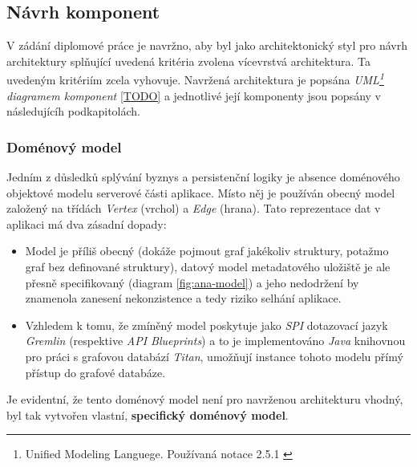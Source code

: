 \subsection{Návrh komponent}
\label{sec:des_components}
V zádání diplomové práce je navržno, aby byl jako architektonický styl pro návrh architektury splňující uvedená kritéria zvolena vícevrstvá architektura. Ta uvedeným kritériím zcela vyhovuje. Navržená architektura je popsána \textit{UML\footnote{Unified Modeling Languege. Používaná notace 2.5.1 \cite{UML17}} diagramem komponent} \ref{TODO} a jednotlivé její komponenty jsou popsány v následujícíh podkapitolách.

\subsubsection{Doménový model}
\label{sec:des_domain}
Jedním z důsledků splývání byznys a persistenční logiky je absence doménového objektové modelu serverové části aplikace. Místo něj je používán obecný model založený na třídách \textit{Vertex} (vrchol) a \textit{Edge} (hrana). Tato reprezentace dat v aplikaci má dva zásadní dopady:

\begin{itemize}
   \item Model je příliš obecný (dokáže pojmout graf jakékoliv struktury, potažmo graf bez definované struktury), datový model metadatového uložiště je ale přesně specifikovaný (diagram \ref{fig:ana-model}) a jeho nedodržení by znamenola zanesení nekonzistence a tedy riziko selhání aplikace.
   \item Vzhledem k tomu, že zmíněný model poskytuje jako \textit{SPI} dotazovací jazyk \textit{Gremlin} (respektive \textit{API Blueprints}) a to je implementováno \textit{Java} knihovnou pro práci s grafovou databází \textit{Titan}, umožňují instance tohoto modelu přímý přístup do grafové databáze.
\end{itemize}

Je evidentní, že tento doménový model není pro navrženou architekturu vhodný, byl tak vytvořen vlastní, \textbf{specifický doménový model}.

